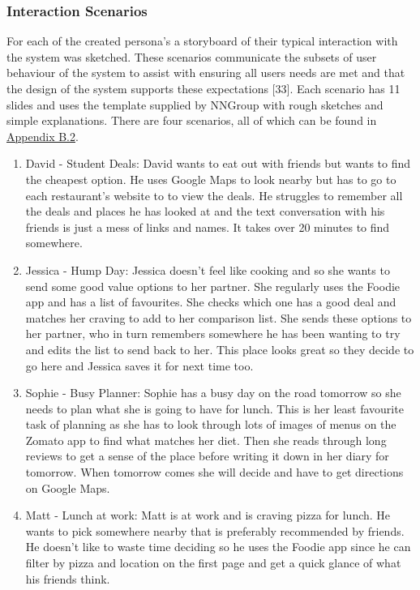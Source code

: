 \documentclass[a4 paper, 12pt]{article}
\begin{document}
 

    \subsubsection{Interaction Scenarios}
    For each of the created persona's a storyboard of their typical interaction with the system was sketched. These scenarios communicate the subsets of user behaviour of the system to assist with ensuring all users needs are met and that the design of the system supports these expectations [33]. Each scenario has 11 slides and uses the template supplied by NNGroup with rough sketches and simple explanations. There are four scenarios, all of which can be found in \hyperref[sec:B.2]{Appendix B.2}.
        \begin{enumerate}
            \item David - Student Deals: David wants to eat out with friends but wants to find the cheapest option. He uses Google Maps to look nearby but has to go to each restaurant's website to to view the deals. He struggles to remember all the deals and places he has looked at and the text conversation with his friends is just a mess of links and names. It takes over 20 minutes to find somewhere.
            \item Jessica - Hump Day: Jessica doesn't feel like cooking and so she wants to send some good value options to her partner. She regularly uses the Foodie app and has a list of favourites. She checks which one has a good deal and matches her craving to add to her comparison list. She sends these options to her partner, who in turn remembers somewhere he has been wanting to try and edits the list to send back to her. This place looks great so they decide to go here and Jessica saves it for next time too.
            \item Sophie - Busy Planner: Sophie has a busy day on the road tomorrow so she needs to plan what she is going to have for lunch. This is her least favourite task of planning as she has to look through lots of images of menus on the Zomato app to find what matches her diet. Then she reads through long reviews to get a sense of the place before writing it down in her diary for tomorrow. When tomorrow comes she will decide and have to get directions on Google Maps.
            \item Matt - Lunch at work: Matt is at work and is craving pizza for lunch. He wants to pick somewhere nearby that is preferably recommended by friends. He doesn't like to waste time deciding so he uses the Foodie app since he can filter by pizza and location on the first page and get a quick glance of what his friends think. 
        \end{enumerate}
\end{document}
